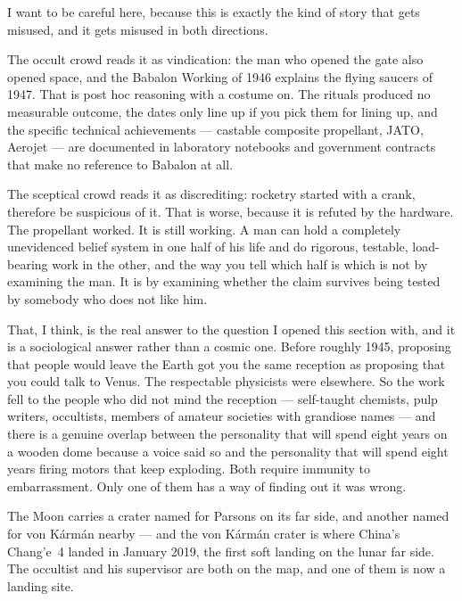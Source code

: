 
I want to be careful here, because this is exactly the kind of story that gets misused, and it
gets misused in both directions.

The occult crowd reads it as vindication: the man who opened the gate also opened space, and the
Babalon Working of 1946 explains the flying saucers of 1947. That is post hoc reasoning with a
costume on. The rituals produced no measurable outcome, the dates only line up if you pick them
for lining up, and the specific technical achievements --- castable composite propellant, JATO,
Aerojet --- are documented in laboratory notebooks and government contracts that make no reference
to Babalon at all.

The sceptical crowd reads it as discrediting: rocketry started with a crank, therefore be
suspicious of it. That is worse, because it is refuted by the hardware. The propellant worked.
It is still working. A man can hold a completely unevidenced belief system in one half of his
life and do rigorous, testable, load-bearing work in the other, and the way you tell which half
is which is not by examining the man. It is by examining whether the claim survives being tested
by somebody who does not like him.


That, I think, is the real answer to the question I opened this section with, and it is a
sociological answer rather than a cosmic one. Before roughly 1945, proposing that people would
leave the Earth got you the same reception as proposing that you could talk to Venus. The
respectable physicists were elsewhere. So the work fell to the people who did not mind the
reception --- self-taught chemists, pulp writers, occultists, members of amateur societies with
grandiose names --- and there is a genuine overlap between the personality that will spend eight
years on a wooden dome because a voice said so and the personality that will spend eight years
firing motors that keep exploding. Both require immunity to embarrassment. Only one of them has
a way of finding out it was wrong.

\begin{funfact}
The Moon carries a crater named for Parsons on its far side, and
another named for von K\'arm\'an nearby --- and the von K\'arm\'an crater is where China's Chang'e~4
landed in January 2019, the first soft landing on the lunar far side. The occultist and his
supervisor are both on the map, and one of them is now a landing site.
\end{funfact}

